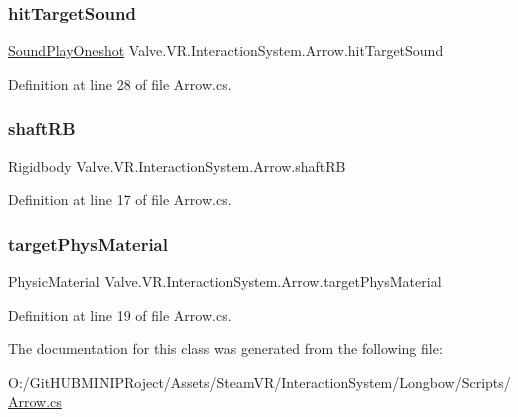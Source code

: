 \subsubsection{\texorpdfstring{hitTargetSound}{hitTargetSound}}
{\footnotesize\ttfamily \mbox{\hyperlink{class_valve_1_1_v_r_1_1_interaction_system_1_1_sound_play_oneshot}{Sound\+Play\+Oneshot}} Valve.\+V\+R.\+Interaction\+System.\+Arrow.\+hit\+Target\+Sound}



Definition at line 28 of file Arrow.\+cs.

\mbox{\label{class_valve_1_1_v_r_1_1_interaction_system_1_1_arrow_a6c27c4428a3bc6485bd112f591218708}} 
\subsubsection{\texorpdfstring{shaftRB}{shaftRB}}
{\footnotesize\ttfamily Rigidbody Valve.\+V\+R.\+Interaction\+System.\+Arrow.\+shaft\+RB}



Definition at line 17 of file Arrow.\+cs.

\mbox{\label{class_valve_1_1_v_r_1_1_interaction_system_1_1_arrow_ae6a1bda880707184acbb465614e7131a}} 
\subsubsection{\texorpdfstring{targetPhysMaterial}{targetPhysMaterial}}
{\footnotesize\ttfamily Physic\+Material Valve.\+V\+R.\+Interaction\+System.\+Arrow.\+target\+Phys\+Material}



Definition at line 19 of file Arrow.\+cs.



The documentation for this class was generated from the following file\+:\begin{DoxyCompactItemize}
\item 
O\+:/\+Git\+H\+U\+B\+M\+I\+N\+I\+P\+Roject/\+Assets/\+Steam\+V\+R/\+Interaction\+System/\+Longbow/\+Scripts/\mbox{\hyperlink{_arrow_8cs}{Arrow.\+cs}}\end{DoxyCompactItemize}
